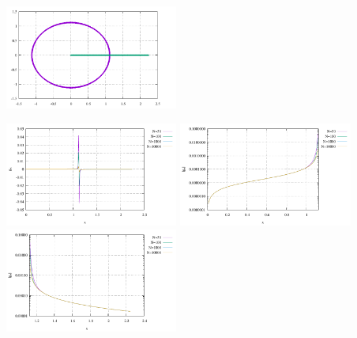 \begin{center}
\includegraphics[width=5.7cm]{python_codes/fieldstone_132/results/case2/setup.pdf}
\end{center}

\begin{center}
\includegraphics[width=5.7cm]{python_codes/fieldstone_132/results/gx.pdf}
\includegraphics[width=5.7cm]{python_codes/fieldstone_132/results/gx2.pdf}
\includegraphics[width=5.7cm]{python_codes/fieldstone_132/results/gx3.pdf}
\end{center}
